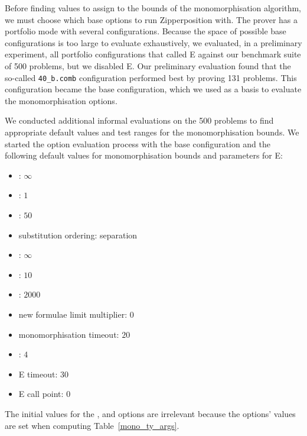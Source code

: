 \documentclass[runningheads]{llncs}
\begin{document}
Before finding values to assign to the bounds of the monomorphisation algorithm, we must choose which base options to run Zipperposition with. The prover has a portfolio mode with several configurations. Because the space of possible base configurations is too large to evaluate exhaustively, we evaluated, in a preliminary experiment, all portfolio configurations that called E against our benchmark suite of 500 problems, but we disabled E.
Our preliminary evaluation found that the so-called \verb|40_b.comb| configuration performed best by proving 131 problems.
This configuration became the base configuration, which we used as a basis to evaluate the monomorphisation options.

We conducted additional informal evaluations on the 500 problems to find appropriate default values and test ranges for the monomorphisation bounds. We started the option evaluation process with the base configuration and the following default values for monomorphisation bounds and parameters for E:
%
\begin{minipage}[t]{.5\textwidth}
\topsep

\begin{itemize}
   \item \PolyCap: \(\infty\)
   \item \PolyMult: \(1\)
   \item \PolyFloor: \(50\)
   \item substitution ordering: separation
   \item \SubstLimit: \(\infty\)
   \item \MonoSubstsLimit: \(10\)
\end{itemize}

\topsep
\end{minipage}\begin{minipage}[t]{.5\textwidth}
\topsep

\begin{itemize}
   \item \Limit: \(2000\)
   \item new formulae limit multiplier: \(0\)
   \item monomorphisation timeout: \(20\)
   \item \Loop: \(4\)
   \item E timeout: \(30\)
   \item E call point: \(0\)
\end{itemize}

\topsep
\end{minipage}
%
The initial values for the \MonoCap, \MonoMult and \MonoFloor options are irrelevant because the options' values are set when computing Table~\ref{mono_ty_args}.%
\end{document}
